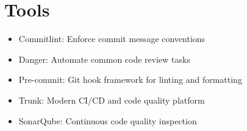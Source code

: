 \documentclass[11pt,openany]{book}
\begin{document}
\section{Tools}
\begin{itemize}
  \item Commitlint: Enforce commit message conventions
  \item Danger: Automate common code review tasks
  \item Pre-commit: Git hook framework for linting and formatting
  \item Trunk: Modern CI/CD and code quality platform
  \item SonarQube: Continuous code quality inspection
\end{itemize}
\end{document}

